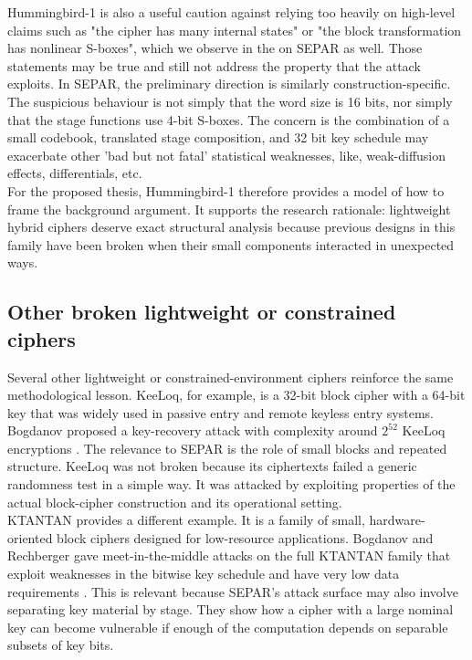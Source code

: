 \documentclass[11pt]{article}
\begin{document}
Hummingbird-1 is also a useful caution against relying too heavily on high-level claims such as "the cipher has many internal states" or "the block transformation has nonlinear S-boxes", which we observe in the on SEPAR as well. Those statements may be true and still not address the property that the attack exploits. In SEPAR, the preliminary direction is similarly construction-specific. The suspicious behaviour is not simply that the word size is 16 bits, nor simply that the stage functions use 4-bit S-boxes. The concern is the combination of a small codebook, translated stage composition, and 32 bit key schedule may exacerbate other 'bad but not fatal' statistical weaknesses, like, weak-diffusion effects, differentials, etc.\\

For the proposed thesis, Hummingbird-1 therefore provides a model of how to frame the background argument. It supports the research rationale: lightweight hybrid ciphers deserve exact structural analysis because previous designs in this family have been broken when their small components interacted in unexpected ways.

\subsection{Other broken lightweight or constrained ciphers}

Several other lightweight or constrained-environment ciphers reinforce the same methodological lesson. KeeLoq, for example, is a 32-bit block cipher with a 64-bit key that was widely used in passive entry and remote keyless entry systems. Bogdanov proposed a key-recovery attack with complexity around $2^{52}$ KeeLoq encryptions \cite{BogdanovKeeLoq2007}. The relevance to SEPAR is the role of small blocks and repeated structure. KeeLoq was not broken because its ciphertexts failed a generic randomness test in a simple way. It was attacked by exploiting properties of the actual block-cipher construction and its operational setting.\\

KTANTAN provides a different example. It is a family of small, hardware-oriented block ciphers designed for low-resource applications. Bogdanov and Rechberger gave meet-in-the-middle attacks on the full KTANTAN family that exploit weaknesses in the bitwise key schedule and have very low data requirements \cite{BogdanovRechberger2010}. This is relevant because SEPAR's attack surface may also involve separating key material by stage. They show how a cipher with a large nominal key can become vulnerable if enough of the computation depends on separable subsets of key bits.\\
\end{document}
